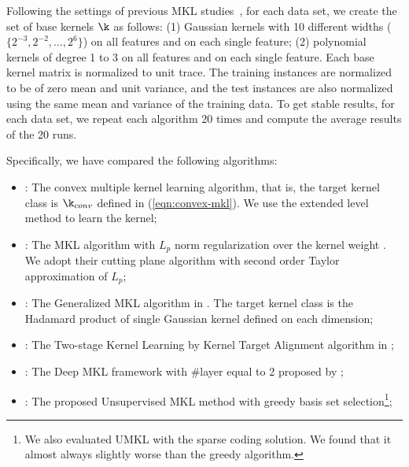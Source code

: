 Following the settings of previous MKL studies~\cite{nips/XuJKL08}, for each data set, we create the set of base kernels $\k$ as follows: %
(1) Gaussian kernels with 10 different widths ($\{2^{-3},2^{-2},\ldots,2^6\}$) on all features and on each single feature; (2) polynomial kernels of degree 1 to 3 on all features and on each single feature. Each base kernel matrix is normalized to unit trace. The training instances are normalized to be of zero mean and unit variance, and the test instances are also normalized using the same mean and variance of the training data. To get stable results, for each data set, we repeat each algorithm 20 times and compute the average results of the 20 runs.

Specifically, we have compared the following algorithms:
\begin{itemize}
  \item []: The convex multiple kernel learning algorithm, that is, the target
         kernel class is $\k_{conv}$ defined in (\ref{eqn:convex-mkl}). We use the
         extended level method \cite{nips/XuJKL08} to learn the kernel;
  \item []\hspace{-1cm}{\bf LpMKL}: The MKL algorithm with $L_p$ norm regularization over
        the kernel weight \cite{nips/KloftBSLMZ09}. We adopt their cutting plane
        algorithm with second order Taylor approximation of $L_p$;
  \item []\hspace{-1cm}{\bf GMKL}: The Generalized MKL algorithm in \cite{icml/VarmaB09}. The target kernel class is the Hadamard product of single Gaussian kernel defined on each dimension;
  \item[]\hspace{-1cm}{\bf KTA}: The Two-stage Kernel Learning by Kernel Target Alignment algorithm in \cite{icml/Cortes09};
  \item[]\hspace{-1cm}{\bf DMKL}: The Deep MKL framework with \#layer equal to 2 proposed by \cite{aistats/ZhuangTH11};
    \item[]: The proposed Unsupervised MKL method with greedy basis set selection\footnote{We also evaluated UMKL with the sparse coding solution. We found that it almost always slightly worse than the greedy algorithm.};
\end{itemize}

